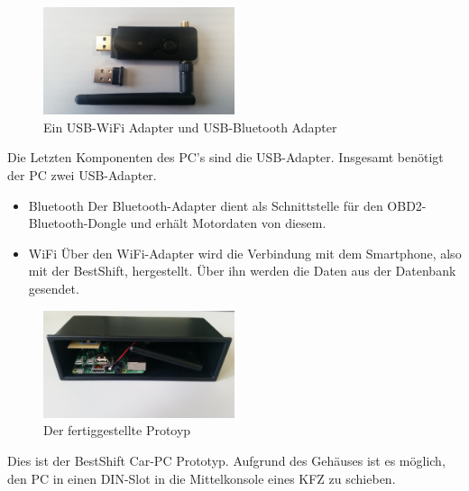 \begin{figure}[!htb]\centering
	\includegraphics[width=0.5\textwidth]{images/usb-adapter}
	\caption{Ein USB-WiFi Adapter und USB-Bluetooth Adapter}
	\label{Fig:usb-adapter}
\end{figure}
Die Letzten Komponenten des PC's sind die USB-Adapter.
Insgesamt benötigt der PC zwei USB-Adapter.
\begin{itemize}
\item Bluetooth \newline
Der Bluetooth-Adapter dient als Schnittstelle für den OBD2-Bluetooth-Dongle und erhält Motordaten von diesem.
\item WiFi \newline
Über den WiFi-Adapter wird die Verbindung mit dem Smartphone, also mit der BestShift, hergestellt. Über ihn werden die Daten aus der Datenbank gesendet.
\end{itemize}

\begin{figure}[!htb]\centering
	\includegraphics[width=0.5\textwidth]{images/assembled-pc}
	\caption{Der fertiggestellte Protoyp}
	\label{Fig:assembled-pc}
\end{figure}
Dies ist der BestShift Car-PC Prototyp. Aufgrund des Gehäuses ist es möglich, den PC in einen DIN-Slot in die Mittelkonsole eines KFZ zu schieben.
\clearpage %